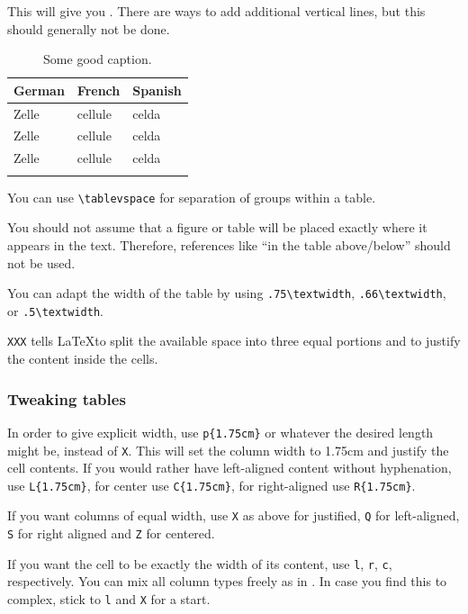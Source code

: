 This will give you  . There are ways to add additional vertical lines, but this should generally not be done. 

\begin{table}[h]
  \begin{tabularx}{\textwidth}{XXX}
    \lsptoprule
    German  & French  & Spanish \\
    \midrule
    Zelle   & cellule & celda    \\
    Zelle   & cellule & celda    \\
    Zelle   & cellule & celda    \\
    \lspbottomrule
  \end{tabularx}
  \caption{Some good caption.}
  \label{tab:chapterhandle:keytotable}
\end{table}

You can use \verb+\tablevspace+ for separation of groups within a table. 

You should not assume that a figure or table will be placed exactly where it appears in the text. Therefore, references like ``in the table above/below'' should not be used. 

You can adapt the width of the table by using \verb+.75\textwidth+,  \verb+.66\textwidth+, or \verb+.5\textwidth+.

\verb+XXX+ tells \LaTeX to split the available space into three equal portions and to justify the content inside the cells. 

\subsubsection{Tweaking tables}
In order to give explicit width, use \verb+p{1.75cm}+ or whatever the desired length might be, instead of \verb+X+. 
This will set the column width to 1.75cm and justify the cell contents. If you would rather have left-aligned content without hyphenation, use \verb+L{1.75cm}+, for center use \verb+C{1.75cm}+, for right-aligned use \verb+R{1.75cm}+.

If you want columns of equal width, use \verb+X+ as above for justified, \verb+Q+ for left-aligned, \verb+S+ for right aligned and \verb+Z+ for centered.

If you want the cell to be exactly the width of its content, use \verb+l+, \verb+r+, \verb+c+, respectively. You can mix all column types freely as in . In case you find this to complex, stick to \verb+l+ and \verb+X+ for a start.

